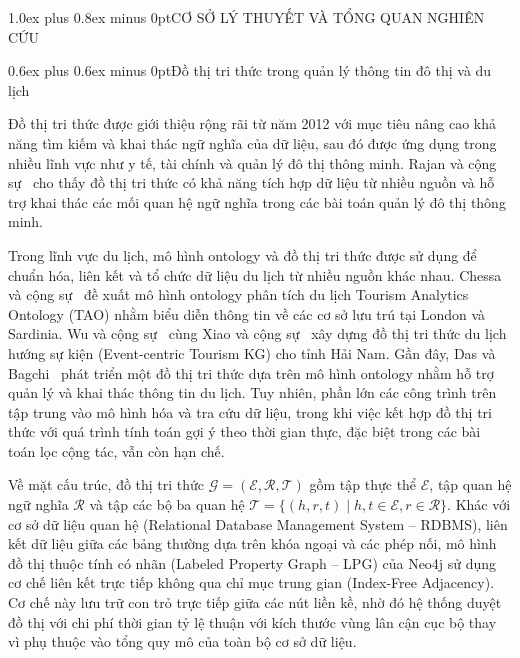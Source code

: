 \documentclass[journal,onecolumn,10pt]{IEEEtran}
\makeatletter
\def\section{\@startsection{section}{1}{\z@}{2.2ex plus 1.2ex minus 0.4ex}%
{1.0ex plus 0.8ex minus 0pt}{\normalfont\normalsize\bfseries\centering}}
\def\subsection{\@startsection{subsection}{2}{\z@}{1.8ex plus 1.0ex minus 0.3ex}%
{0.6ex plus 0.6ex minus 0pt}{\normalfont\normalsize\bfseries}}
\makeatother
\begin{document}
\FloatBarrier

\section{CƠ SỞ LÝ THUYẾT VÀ TỔNG QUAN NGHIÊN CỨU}

\subsection{Đồ thị tri thức trong quản lý thông tin đô thị và du lịch}

Đồ thị tri thức được giới thiệu rộng rãi từ năm 2012 với mục tiêu nâng cao khả năng tìm kiếm và khai thác ngữ nghĩa của dữ liệu, sau đó được ứng dụng trong nhiều lĩnh vực như y tế, tài chính và quản lý đô thị thông minh. Rajan và cộng sự~\cite{r11} cho thấy đồ thị tri thức có khả năng tích hợp dữ liệu từ nhiều nguồn và hỗ trợ khai thác các mối quan hệ ngữ nghĩa trong các bài toán quản lý đô thị thông minh.

Trong lĩnh vực du lịch, mô hình ontology và đồ thị tri thức được sử dụng để chuẩn hóa, liên kết và tổ chức dữ liệu du lịch từ nhiều nguồn khác nhau. Chessa và cộng sự~\cite{r15} đề xuất mô hình ontology phân tích du lịch Tourism Analytics Ontology (TAO) nhằm biểu diễn thông tin về các cơ sở lưu trú tại London và Sardinia. Wu và cộng sự~\cite{r13} cùng Xiao và cộng sự~\cite{r14} xây dựng đồ thị tri thức du lịch hướng sự kiện (Event-centric Tourism KG) cho tỉnh Hải Nam. Gần đây, Das và Bagchi~\cite{r12} phát triển một đồ thị tri thức dựa trên mô hình ontology nhằm hỗ trợ quản lý và khai thác thông tin du lịch. Tuy nhiên, phần lớn các công trình trên tập trung vào mô hình hóa và tra cứu dữ liệu, trong khi việc kết hợp đồ thị tri thức với quá trình tính toán gợi ý theo thời gian thực, đặc biệt trong các bài toán lọc cộng tác, vẫn còn hạn chế.

Về mặt cấu trúc, đồ thị tri thức $\mathcal{G} = (\mathcal{E}, \mathcal{R}, \mathcal{T})$ gồm tập thực thể $\mathcal{E}$, tập quan hệ ngữ nghĩa $\mathcal{R}$ và tập các bộ ba quan hệ $\mathcal{T} = \{(h, r, t) \mid h, t \in \mathcal{E}, r \in \mathcal{R}\}$. Khác với cơ sở dữ liệu quan hệ (Relational Database Management System -- RDBMS), liên kết dữ liệu giữa các bảng thường dựa trên khóa ngoại và các phép nối, mô hình đồ thị thuộc tính có nhãn (Labeled Property Graph -- LPG) của Neo4j sử dụng cơ chế liên kết trực tiếp không qua chỉ mục trung gian (Index-Free Adjacency). Cơ chế này lưu trữ con trỏ trực tiếp giữa các nút liền kề, nhờ đó hệ thống duyệt đồ thị với chi phí thời gian tỷ lệ thuận với kích thước vùng lân cận cục bộ thay vì phụ thuộc vào tổng quy mô của toàn bộ cơ sở dữ liệu.
\end{document}
